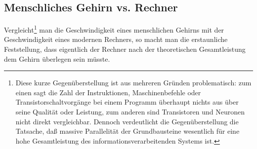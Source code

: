 \subsection*{Menschliches Gehirn vs. Rechner}
Vergleicht\footnote{Diese kurze Gegenüberstellung ist aus mehreren Gründen problematisch: zum
einen sagt die Zahl der Instruktionen, Maschinenbefehle oder
Transistorschaltvorgänge bei einem Programm überhaupt nichts aus über seine
Qualität oder Leistung, zum anderen sind Transistoren und Neuronen nicht direkt
vergleichbar. Dennoch verdeutlicht die Gegenüberstellung die Tatsache, daß
massive Parallelität der Grundbausteine wesentlich für eine hohe Gesamtleistung
des informationsverarbeitenden Systems ist.} man die Geschwindigkeit eines menschlichen Gehirns mit der
Geschwindigkeit eines modernen Rechners, so macht man die erstaunliche
Feststellung, dass eigentlich der Rechner nach der theoretischen Gesamtleistung
dem Gehirn überlegen sein müsste. 

